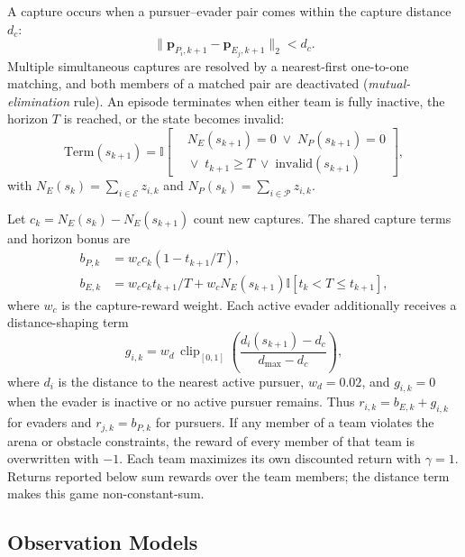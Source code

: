 \documentclass[letterpaper,10pt,conference]{ieeeconf}
\begin{document}
A capture occurs when a pursuer--evader pair comes within the capture
distance $d_c$:
\begin{equation}
\|\mathbf{p}_{P_i,k+1}-\mathbf{p}_{E_j,k+1}\|_2 < d_c .
\end{equation}
Multiple simultaneous captures are resolved by a nearest-first one-to-one
matching, and both members of a matched pair are deactivated
(\emph{mutual-elimination} rule). An episode terminates when either team
is fully inactive, the horizon $T$ is reached, or the state becomes
invalid:
\begin{equation}
\mathrm{Term}(s_{k+1}) =
\mathbb{I}\!\left[
 \begin{aligned}
 &N_E(s_{k+1})=0 \;\vee\; N_P(s_{k+1})=0\\[-1mm]
 &{}\vee\; t_{k+1}\ge T \;\vee\; \mathrm{invalid}(s_{k+1})
 \end{aligned}
\right],
\end{equation}
with $N_E(s_k)=\sum_{i\in\mathcal{E}}z_{i,k}$ and
$N_P(s_k)=\sum_{i\in\mathcal{P}}z_{i,k}$.

Let $c_k=N_E(s_k)-N_E(s_{k+1})$ count new captures. The shared
capture terms and horizon bonus are
\begin{equation}
\begin{aligned}
b_{P,k}&=w_c c_k(1-t_{k+1}/T),\\
b_{E,k}&=w_c c_k t_{k+1}/T
 +w_c N_E(s_{k+1})\mathbb I[t_k<T\le t_{k+1}],
\end{aligned}
\end{equation}
where $w_c$ is the capture-reward weight. Each active evader additionally
receives a distance-shaping term
\begin{equation}
g_{i,k}=w_d\,\operatorname{clip}_{[0,1]}
 \left(\frac{d_i(s_{k+1})-d_c}{d_{\max}-d_c}\right),
\end{equation}
where $d_i$ is the distance to the nearest active pursuer, $w_d=0.02$,
and $g_{i,k}=0$ when the evader is inactive or no active pursuer remains.
Thus $r_{i,k}=b_{E,k}+g_{i,k}$ for evaders and $r_{j,k}=b_{P,k}$ for
pursuers. If any member of a team violates the arena or obstacle
constraints, the reward of every member of that team is overwritten
with $-1$. Each team maximizes its own discounted return with
$\gamma=1$. Returns reported below sum rewards over the team members;
the distance term makes this game non-constant-sum.

\subsection{Observation Models}
\label{sec:observations}
\end{document}
